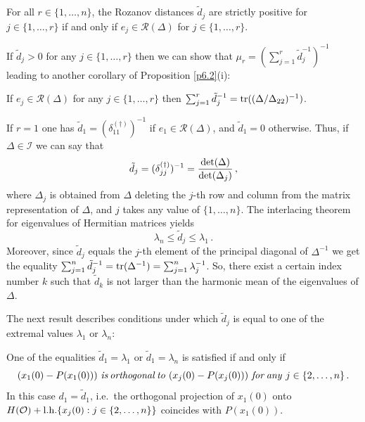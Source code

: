 \documentclass{amsart}
\begin{document}
{\begin{cor}   \label{c6.4}
  For all $r \in \{ 1,\ldots,n \}$, the Rozanov distances $\tilde{d}_j$ are strictly positive for $j \in \{ 1,\ldots,r \}$ if and only if $e_j \in {\mathcal R}(\Delta)$ for $j \in \{ 1,\ldots,r \}$.
\end{cor}   
   
If $\tilde{d}_j > 0$ for any $j \in \{ 1,\ldots,r \}$ then we can show that $\mu_r=(\sum_{j=1}^r \tilde{d}_j^{-1})^{-1}$ leading to another corollary of Proposition \ref{p6.2}(i):

\begin{cor} \label{c6.5}
    If $e_j \in {\mathcal R}(\Delta)$ for any $j \in \{ 1,\ldots,r \}$ then $\sum_{j=1}^r \tilde{d}_j^{-1} = {\rm tr}((\Delta / \Delta_{22})^{-1})$. 
\end{cor}

If $r=1$ one has $\tilde{d}_1=(\delta_{11}^{(\dagger)})^{-1}$ if $e_1 \in {\mathcal R}(\Delta)$, and $\tilde{d}_1=0$ otherwise. Thus, if $\Delta \in {\mathcal I}$ we can say that 
\begin{equation} \label{f6.8}
     \tilde{d}_j = (\delta_{jj}^{(\dagger)})^{-1} = \frac{{\rm det}(\Delta)}{{\rm det}(\Delta_j)} \, , 
\end{equation}
where $\Delta_j$ is obtained from $\Delta$ deleting the $j$-th row and column from the matrix representation of $\Delta$, and $j$ takes any value of $\{ 1,\ldots,n \}$. The interlacing theorem for eigenvalues of Hermitian matrices yields
\[
    \lambda_n \leq \tilde{d}_j \leq \lambda_1 \, .
\]
Moreover, since $\tilde{d}_j$ equals the $j$-th element of the principal diagonal of $\Delta^{-1}$ we get the equality $\sum_{j=1}^n \tilde{d}_j^{-1} = {\rm tr}(\Delta^{-1}) = \sum_{j=1}^n \lambda_j^{-1}$. So, there exist a certain index number $k$ such that $\tilde{d}_k$ is not larger than the harmonic mean of the eigenvalues of $\Delta$. 

The next result describes conditions under which $\tilde{d}_j$ is equal to one of the extremal values $\lambda_1$ or $\lambda_n$:

\begin{pro}   \label{p6.6}
   One of the equalities $\tilde{d}_1=\lambda_1$ or $\tilde{d}_1=\lambda_n$ is satisfied if and only if
   \begin{equation} \label{f6.9}
        (x_1(0)-{P}(x_1(0))) \,\, {\it is} \, {\it orthogonal} \, {\it to} \,\, (x_j(0)-{P}(x_j(0))) \,\, {\it for} \, {\it any} \,\, j \in \{ 2,\ldots,n \}    \,. 
   \end{equation}
   In this case $d_1=\tilde{d}_1$, i.e.~the orthogonal projection of $x_1(0)$ onto $H({\mathcal O})+ {\rm l.h.} \{x_j(0) : j \in \{ 2,\ldots,n \}\}$ coincides with ${P}(x_1(0))$. 
\end{pro}   
        
}
\end{document}
